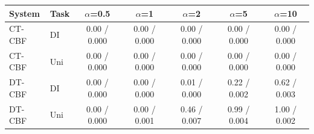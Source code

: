 \begin{tabular}{llccccc}
\hline
System & Task & $\alpha$=0.5 & $\alpha$=1 & $\alpha$=2 & $\alpha$=5 & $\alpha$=10 \\
\hline
CT-CBF & DI & 0.00 / 0.000 & 0.00 / 0.000 & 0.00 / 0.000 & 0.00 / 0.000 & 0.00 / 0.000 \\
CT-CBF & Uni & 0.00 / 0.000 & 0.00 / 0.000 & 0.00 / 0.000 & 0.00 / 0.000 & 0.00 / 0.000 \\
DT-CBF & DI & 0.00 / 0.000 & 0.00 / 0.000 & 0.01 / 0.000 & 0.22 / 0.002 & 0.62 / 0.003 \\
DT-CBF & Uni & 0.00 / 0.000 & 0.00 / 0.001 & 0.46 / 0.007 & 0.99 / 0.004 & 1.00 / 0.002 \\
\hline
\end{tabular}
